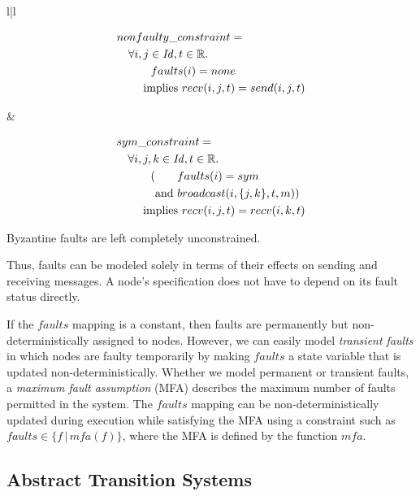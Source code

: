 \documentclass{llncs/llncs}
\newcommand{\Id}{\ensuremath{\mathit{Id}}\xspace}
\newcommand{\mfa}{\ensuremath{\mathit{mfa}}\xspace}
\begin{document}
\begin{center}
\begin{tabular}{l|l}
\begin{minipage}[t]{0.5\linewidth}
\[\begin{aligned}
&nonfaulty\_constraint =\\
  &\quad \forall i, j \in \Id, t \in \mathbb{R}.\\
  &\quad\quad\quad faults(i) = none\\
  &\quad\quad \textnormal{ implies } recv(i, j, t) = send(i, j, t)
\end{aligned}\]
\end{minipage}&
\begin{minipage}[t]{0.5\linewidth}
\[\begin{aligned}
&sym\_constraint =\\
  &\quad \forall i, j, k \in \Id, t \in \mathbb{R}.\\
  &\quad\quad\quad (\phantom{\textnormal{and }} faults(i) = sym\\
  &\quad\quad\quad \phantom{(}\textnormal{and } broadcast(i, \{j, k\}, t, m))\\
  &\quad\quad \textnormal{ implies } recv(i, j, t) = recv(i, k, t)
\end{aligned}\]
\end{minipage}
\end{tabular}
\end{center}

\noindent
Byzantine faults are left completely unconstrained.

Thus, faults can be modeled solely in terms of their effects on sending and receiving messages. A node's specification does not have to depend on its fault status directly.

If the $faults$ mapping is a constant, then faults are permanently but non-deterministically assigned to nodes. However, we can easily model \emph{transient faults} in which nodes are faulty temporarily by making $faults$ a state variable that is updated non-deterministically. Whether we model permanent or transient faults, a \emph{maximum fault assumption} (MFA) describes the maximum number of faults permitted in the system. The $faults$ mapping can be non-deterministically updated during execution while satisfying the MFA using a constraint such as $faults \in \{f \, | \, \mfa(f) \}$, where the MFA is defined by the function $\mfa$.


\subsection{Abstract Transition Systems}\label{sec:abstract}
\end{document}
